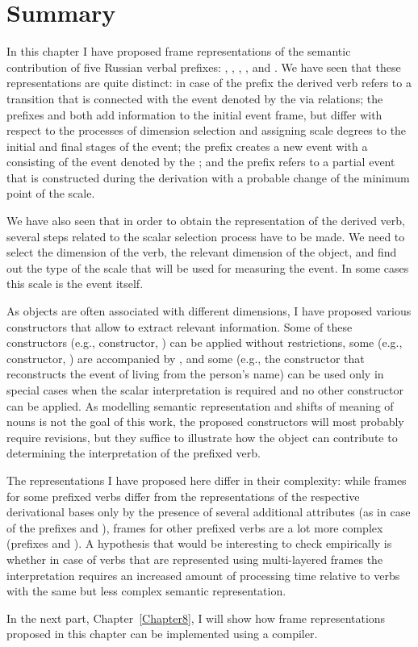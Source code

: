 \section{Summary}
In this chapter I have proposed frame representations of the semantic contribution of five Russian verbal prefixes: , , , , and . We have seen that these representations are quite distinct: in case of the prefix  the derived verb refers to a transition that is connected with the event denoted by the  via relations; the prefixes  and  both add information to the initial event frame, but differ with respect to the processes of dimension selection and assigning scale degrees to the initial and final stages of the event; the prefix  creates a new event with a  consisting of the event denoted by the ; and the prefix  refers to a partial event that is constructed during the derivation with a probable change of the minimum point of the  scale.

We have also seen that in order to obtain the representation of the derived verb, several steps related to the scalar selection process have to be made. We need to select the dimension of the verb, the relevant dimension of the object, and find out the type of the scale that will be used for measuring the event. In some cases this scale is the event itself. 

As objects are often associated with different dimensions, I have proposed various constructors that allow to extract relevant information. Some of these constructors (e.g.,  constructor, ) can be applied without restrictions, some (e.g.,  constructor, ) are accompanied by , and some (e.g., the constructor that reconstructs the event of living from the person's name) can be used only in special cases when the scalar interpretation is required and no other constructor can be applied. As modelling semantic representation and shifts of meaning of nouns is not the goal of this work, the proposed constructors will most probably require revisions, but they suffice to illustrate how the object can contribute to determining the interpretation of the prefixed verb.

The representations I have proposed here differ in their complexity: while frames for some prefixed verbs differ from the representations of the respective derivational bases only by the presence of several additional attributes (as in case of the prefixes  and ), frames for other prefixed verbs are a lot more complex (prefixes  and ). A hypothesis that would be interesting to check empirically is whether in case of verbs that are represented using multi-layered frames the interpretation requires an increased amount of processing time relative to verbs with the same  but less complex semantic representation.


In the next part, Chapter~\ref{Chapter8}, I will show how frame representations proposed in this chapter can be implemented using a  compiler.

